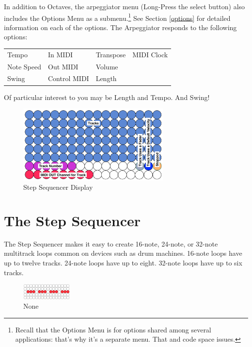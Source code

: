 \documentclass{article}
\begin{document}
In addition to Octaves, the arpeggiator menu (Long-Press the select button) also includes the Options Menu as a submenu.\footnote{Recall that the Options Menu is for options shared among several applications: that's why it's a separate menu.  That and code space issues.}  See Section \ref{options} for detailed information on each of the options.  The Arpeggiator responds to the following options:

\vspace{1em}
\begin{tabular}{llll}
Tempo& 			In MIDI&		Transpose&	MIDI Clock\\
Note Speed& 		Out MIDI& 	Volume	&\\
Swing& 			Control MIDI&	Length	&\\
\end{tabular}

\vspace{1em}
Of particular interest to you may be Length and Tempo.  And Swing!

\begin{figure}
\vspace{-4em}\includegraphics[width=3in]{stepsequencer}
\vspace{-2em}\caption{\small Step Sequencer Display}\vspace{-1em}
\label{stepsequencer}
\end{figure}

\section {The Step Sequencer}

The Step Sequencer makes it easy to create 16-note, 24-note, or 32-note multitrack loops common on devices such as drum machines.  16-note loops have up to twelve tracks.  24-note loops have up to eight.  32-note loops have up to six tracks.

\begin{figure}
\vspace{-1.5em}\includegraphics[width=1in]{none.pdf}
\vspace{-2em}\caption{\small None}\vspace{-2em}
\label{none}
\end{figure}
\end{document}
